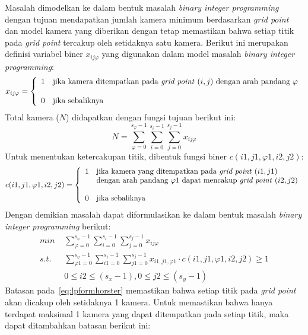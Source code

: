 Masalah dimodelkan ke dalam bentuk masalah \textit{binary integer programming} dengan tujuan mendapatkan jumlah kamera minimum berdasarkan \textit{grid point} dan model kamera yang diberikan dengan tetap memastikan bahwa setiap titik pada \textit{grid point} tercakup oleh setidaknya satu kamera. Berikut ini merupakan definisi variabel biner \(x_{ij\varphi}\) yang digunakan dalam model masalah \textit{binary integer programming}:
\begin{equation}
	x_{ij\varphi}=\left\{
		\begin{array}{cl}
			1 & \text{jika kamera ditempatkan pada \textit{grid point} }(i,j) \text{ dengan arah pandang } \varphi\\\\
			0 & \text{jika sebaliknya}
		\end{array}
	\right.
\end{equation}
Total kamera (\(N\)) didapatkan dengan fungsi tujuan berikut ini:
\begin{equation}
	N=\sum_{\varphi=0}^{s_\varphi-1}\sum_{i=0}^{s_i-1}\sum_{j=0}^{s_j-1}x_{ij\varphi}
\end{equation}
Untuk menentukan ketercakupan titik, dibentuk fungsi biner \(c(i1,j1,\varphi1,i2,j2)\):
\begin{equation}
	c(i1,j1,\varphi1,i2,j2)=\left \{
		\begin{array}{cl}
			1 & \text{jika kamera yang ditempatkan pada \textit{grid point} }(i1,j1)\\
			 & \text{dengan arah pandang }\varphi{1}\text{ dapat mencakup \textit{grid point} }(i2,j2)\\\\
			 0 & \text{jika sebaliknya}
		\end{array}
	\right.
\end{equation}
Dengan demikian masalah dapat diformulasikan ke dalam bentuk masalah \textit{binary integer programming} berikut:
\begin{equation}
	\begin{split}
		\textit{min } & \sum_{\varphi=0}^{s_\varphi-1}\sum_{i=0}^{s_i-1}\sum_{j=0}^{s_j-1}x_{ij\varphi}\\
		\textit{s.t. } & \sum_{\varphi{1}=0}^{s_\varphi-1}\sum_{i1=0}^{s_i-1}\sum_{j1=0}^{s_j-1}x_{i1,j1,\varphi{1}}\cdot c(i1,j1,\varphi1,i2,j2)\geq 1\\
		&0\leq i2\leq(s_x-1), 0\leq j2\leq(s_y-1)
	\end{split}
	\label{eq:lpformhorster}
\end{equation}
Batasan pada~\ref{eq:lpformhorster} memastikan bahwa setiap titik pada \textit{grid point} akan dicakup oleh setidaknya 1 kamera. Untuk memastikan bahwa hanya terdapat maksimal 1 kamera yang dapat ditempatkan pada setiap titik, maka dapat ditambahkan batasan berikut ini:
